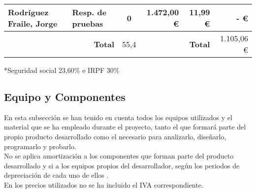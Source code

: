 \begin{table}[H]
{\begin{tabular}{ll|c|rr|r|}
			\multicolumn{1}{|l|}{Rodríguez Fraile, Jorge}                             & Resp. de pruebas                                            & 0                                      & \multicolumn{1}{r|}{1.472,00 €}                              & 11,99 €                                                                              & -   €                                                                                \\ \hline
			                                                                          & \multicolumn{1}{r|}{\textbf{Total}}                         & 55,4                                   & \multicolumn{1}{l}{}                                         & \textbf{Total}                                                                       & 1.105,06 €                                                                           \\ \cline{3-3} \cline{6-6}
		\end{tabular}%
	}
\end{table}

*Seguridad social 23,60\%\cite{noauthor_seguridad_nodate} e IRPF 30\%\cite{trecet_irpf_nodate}

\subsection{Equipo y Componentes}
En esta subsección se han tenido en cuenta todos los equipos utilizados y el material que se ha empleado durante el proyecto, tanto el que formará parte del propio producto desarrollado como el necesario para analizarlo, diseñarlo, programarlo y probarlo. \\ No se aplica amortización a los componentes que forman parte del producto desarrollado y si a los equipos propios del desarrollador, según los periodos de depreciación de cada uno de ellos \cite{thiebaud_-muller_service_2018}. \\ En los precios utilizados no se ha incluido el IVA correspondiente.

